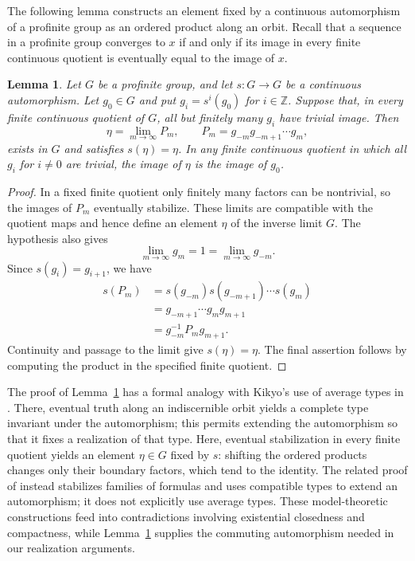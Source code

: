 \documentclass[10pt,a4paper]{amsart}
\newtheorem{lemma}[theorem]{Lemma}
\theoremstyle{definition}
\newcommand{\Z}{\mathbb Z}
\begin{document}
The following lemma constructs an element fixed by a continuous
automorphism of a profinite group as an ordered product along
an orbit. Recall that a sequence in a profinite group converges
to $x$ if and only if its image in every finite continuous quotient
is eventually equal to the image of $x$.
\begin{lemma}\label{lem:ordered-product}
Let $G$ be a profinite group, and let $s:G\to G$
be a continuous automorphism.
Let $g_0\in G$ and put $g_i=s^i(g_0)$ for $i\in\Z$.
Suppose that, in every finite continuous quotient of $G$, all but
finitely many $g_i$ have trivial image. Then
\[
\eta=\lim_{m\to\infty}P_m,
\qquad P_m=g_{-m}g_{-m+1}\cdots g_m,
\]
exists in $G$ and satisfies $s(\eta)=\eta$.
In any finite continuous quotient in which all $g_i$
for $i\ne0$ are trivial, the image of $\eta$ is the
image of $g_0$.
\end{lemma}

\begin{proof}
In a fixed finite quotient only finitely many factors can be
nontrivial, so the images of $P_m$ eventually stabilize.
These limits are compatible with the quotient maps and hence
define an element $\eta$ of the inverse limit $G$.
The hypothesis also gives
\[
\lim_{m\to\infty}g_m=1=\lim_{m\to\infty}g_{-m}.
\]
Since $s(g_i)=g_{i+1}$, we have
\[
\begin{aligned}
s(P_m)
&=s(g_{-m})s(g_{-m+1})\cdots s(g_m)\\
&=g_{-m+1}\cdots g_mg_{m+1}\\
&=g_{-m}^{-1}P_mg_{m+1}.
\end{aligned}
\]
Continuity and passage to the limit give $s(\eta)=\eta$.
The final assertion follows by computing the product in the
specified finite quotient.
\end{proof}


The proof of Lemma~\ref{lem:ordered-product} has a formal analogy
with Kikyo's use of average types in
\cite[Theorems~3.1 and~3.3]{Kikyo}. There, eventual truth along
an indiscernible orbit yields
a complete type invariant under the automorphism; this permits
extending the automorphism so that it fixes a realization of
that type. Here, eventual stabilization in every finite quotient
yields an element $\eta\in G$ fixed by $s$:
shifting the ordered products changes only their boundary factors,
which tend to the identity. The related proof of
\cite[Theorem~1]{KikyoShelah} instead stabilizes families of
formulas and uses compatible types to extend an automorphism;
it does not explicitly use average types. These model-theoretic
constructions feed into contradictions involving existential
closedness and compactness, while Lemma~\ref{lem:ordered-product}
supplies the commuting automorphism needed in our realization
arguments.
\end{document}
